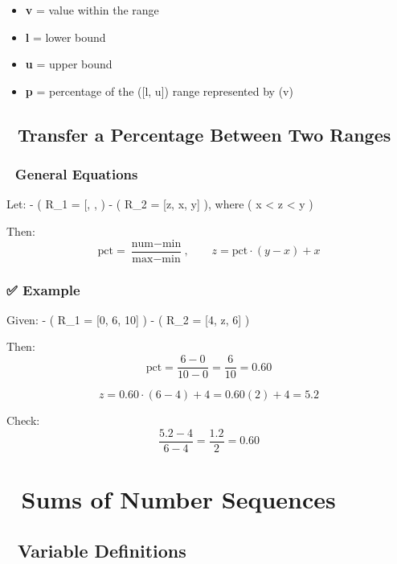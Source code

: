\documentclass[
  letterpaper,
]{book}
\providecommand{\tightlist}{%
  \setlength{\itemsep}{0pt}\setlength{\parskip}{0pt}}
\begin{document}
\begin{itemize}
\tightlist
\item
  \textbf{v} = value within the range\\
\item
  \textbf{l} = lower bound\\
\item
  \textbf{u} = upper bound\\
\item
  \textbf{p} = percentage of the ({[}l, u{]}) range represented by (v)
\end{itemize}

\subsection{🔁 Transfer a Percentage Between Two
Ranges}\label{transfer-a-percentage-between-two-ranges}

\subsubsection{🧮 General Equations}\label{general-equations}

Let: - ( R\_1 = {[}, , \text{max}{]} ) - ( R\_2 =
{[}z, x, y{]} ), where ( x \textless{} z \textless{} y )

Then: \[
\text{pct} = \frac{\text{num} - \text{min}}{\text{max} - \text{min}}, \qquad
z = \text{pct} \cdot (y - x) + x
\]

\subsubsection{✅ Example}\label{example}

Given: - ( R\_1 = {[}0, 6, 10{]} ) - ( R\_2 = {[}4, z, 6{]} )

Then: \[
\text{pct} = \frac{6 - 0}{10 - 0} = \frac{6}{10} = 0.60
\]

\[
z = 0.60 \cdot (6 - 4) + 4 = 0.60(2) + 4 = 5.2
\]

Check: \[
\frac{5.2 - 4}{6 - 4} = \frac{1.2}{2} = 0.60
\]

\section{🔢 Sums of Number Sequences}\label{sums-of-number-sequences}

\subsection{📘 Variable Definitions}\label{variable-definitions-2}
\end{document}
